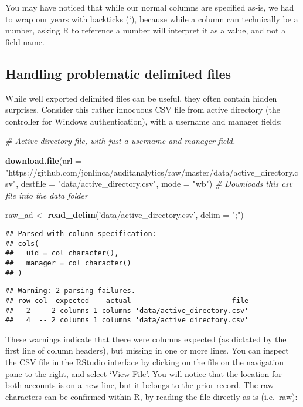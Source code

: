 \documentclass[
]{book}
\newenvironment{Shaded}{\begin{snugshade}}{\end{snugshade}}
\newcommand{\CommentTok}[1]{\textcolor[rgb]{0.56,0.35,0.01}{\textit{#1}}}
\newcommand{\DataTypeTok}[1]{\textcolor[rgb]{0.13,0.29,0.53}{#1}}
\newcommand{\KeywordTok}[1]{\textcolor[rgb]{0.13,0.29,0.53}{\textbf{#1}}}
\newcommand{\NormalTok}[1]{#1}
\newcommand{\StringTok}[1]{\textcolor[rgb]{0.31,0.60,0.02}{#1}}
\begin{document}
You may have noticed that while our normal columns are specified as-is, we had to wrap our years with backticks (`), because while a column can technically be a number, asking R to reference a number will interpret it as a value, and not a field name.

\hypertarget{handling-problematic-delimited-files}{%
\subsection{Handling problematic delimited files}\label{handling-problematic-delimited-files}}

While well exported delimited files can be useful, they often contain hidden surprises. Consider this rather innocuous CSV file from active directory (the controller for Windows authentication), with a username and manager fields:

\begin{Shaded}
\begin{Highlighting}[]
\CommentTok{# Active directory file, with just a username and manager field.}

\KeywordTok{download.file}\NormalTok{(}\DataTypeTok{url =} \StringTok{"https://github.com/jonlinca/auditanalytics/raw/master/data/active_directory.csv"}\NormalTok{,}
              \DataTypeTok{destfile =} \StringTok{"data/active_directory.csv"}\NormalTok{, }\DataTypeTok{mode =} \StringTok{"wb"}\NormalTok{) }\CommentTok{# Downloads this csv file into the data folder}

\NormalTok{raw_ad <-}\StringTok{ }\KeywordTok{read_delim}\NormalTok{(}\StringTok{'data/active_directory.csv'}\NormalTok{, }\DataTypeTok{delim =} \StringTok{";"}\NormalTok{)}
\end{Highlighting}
\end{Shaded}

\begin{verbatim}
## Parsed with column specification:
## cols(
##   uid = col_character(),
##   manager = col_character()
## )
\end{verbatim}

\begin{verbatim}
## Warning: 2 parsing failures.
## row col  expected    actual                        file
##   2  -- 2 columns 1 columns 'data/active_directory.csv'
##   4  -- 2 columns 1 columns 'data/active_directory.csv'
\end{verbatim}

These warnings indicate that there were columns expected (as dictated by the first line of column headers), but missing in one or more lines. You can inspect the CSV file in the RStudio interface by clicking on the file on the navigation pane to the right, and select `View File'. You will notice that the location for both accounts is on a new line, but it belongs to the prior record. The raw characters can be confirmed within R, by reading the file directly as is (i.e.~raw):
\end{document}
